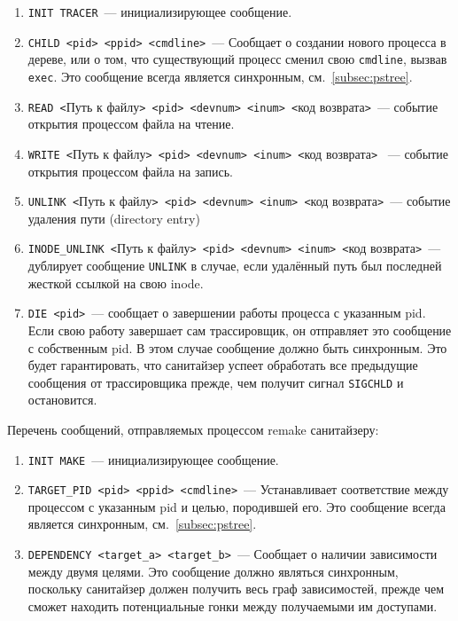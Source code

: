 \begin{enumerate}
    \item \texttt{INIT TRACER}~--- инициализирующее сообщение.
    \item \texttt{CHILD <pid> <ppid> <cmdline>}~--- Сообщает о создании нового процесса в дереве, или о том, что существующий процесс сменил свою \texttt{cmdline}, вызвав \texttt{exec}. Это сообщение всегда является синхронным, см.~\ref{subsec:pstree}.
    \item \texttt{READ <}Путь к файлу\texttt{> <pid> <devnum> <inum> <}код возврата\texttt{>}~--- событие открытия процессом файла на чтение.
    \item \texttt{WRITE <}Путь к файлу\texttt{> <pid> <devnum> <inum> <}код возврата\texttt{>}
   ~--- событие открытия процессом файла на запись.
    \item \texttt{UNLINK <}Путь к файлу\texttt{> <pid> <devnum> <inum> <}код возврата\texttt{>}~--- событие удаления пути (directory entry)
    \item \texttt{INODE\_UNLINK <}Путь к файлу\texttt{> <pid> <devnum> <inum> <}код возврата\texttt{>}~--- дублирует сообщение \texttt{UNLINK} в случае, если удалённый путь был последней жесткой ссылкой на свою inode.
    \item \texttt{DIE <pid>}~--- сообщает о завершении работы процесса с указанным pid. Если свою работу завершает сам трассировщик, он отправляет это сообщение с собственным pid. В этом случае сообщение должно быть синхронным. Это будет гарантировать, что санитайзер успеет обработать все предыдущие сообщения от трассировщика прежде, чем получит сигнал \texttt{SIGCHLD} и остановится.
\end{enumerate}

Перечень сообщений, отправляемых процессом remake санитайзеру:

\begin{enumerate}
    \item \texttt{INIT MAKE}~--- инициализирующее сообщение.
    \item \texttt{TARGET\_PID <pid> <ppid> <cmdline>}~--- Устанавливает соответствие между процессом с указанным pid и целью, породившей его. Это сообщение всегда является синхронным, см.~\ref{subsec:pstree}.
    \item \texttt{DEPENDENCY <target\_a> <target\_b>}~--- Сообщает о наличии зависимости между двумя целями. Это сообщение должно являться синхронным, поскольку санитайзер должен получить весь граф зависимостей, прежде чем сможет находить потенциальные гонки между получаемыми им доступами.
\end{enumerate}

